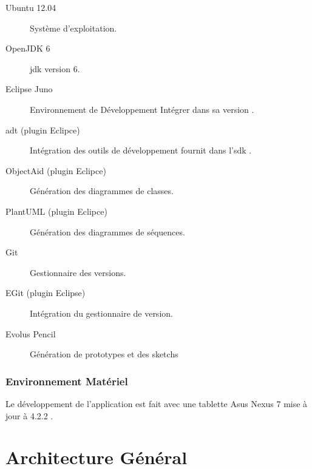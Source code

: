 \begin{description}

\item [Ubuntu 12.04] Système d'exploitation.\footnotemark[1]

\item [OpenJDK 6] \gls{jdk} version 6.\footnotemark[2]

\item [Eclipse Juno] Environnement de Développement Intégrer dans sa version .\footnotemark[3]

\item [\gls{adt} (plugin Eclipce)] Intégration des outils de développement fournit dans l'\gls{sdk} \android{}.\footnotemark[4]

\item [ObjectAid (plugin Eclipce)] Génération des diagrammes de classes.\footnotemark[5]

\item [PlantUML (plugin Eclipce)] Génération des diagrammes de séquences.\footnotemark[6]

\item [Git] Gestionnaire des versions\footnotemark[7].

\item [EGit (plugin Eclipse)] Intégration du gestionnaire de version.\footnotemark[8]

\item [Evolus Pencil] Génération de prototypes et des sketchs\footnotemark[9]
\end{description}


\subsubsection{Environnement Matériel}
Le développement de l'application est fait avec une tablette Asus Nexus 7 mise à jour à \android{} 4.2.2 .

\section{Architecture Général}

